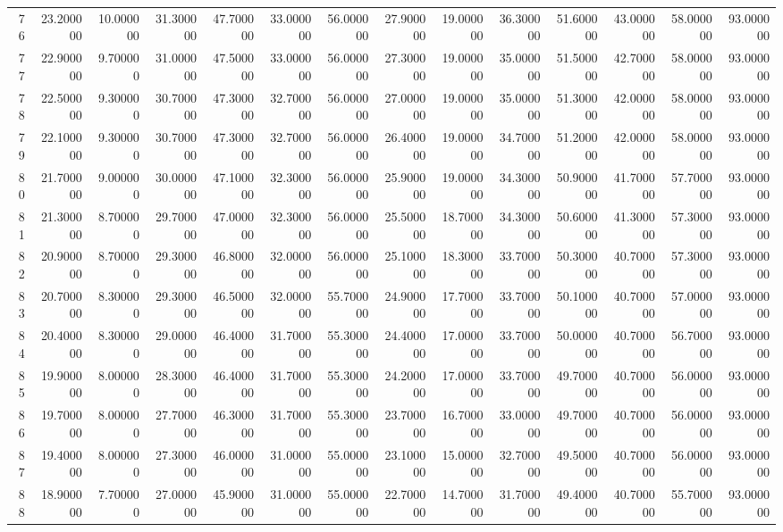 \begin{tabular}{rrrrrrrrrrrrrr}
76 & 23.200000 & 10.000000 & 31.300000 & 47.700000 & 33.000000 & 56.000000 & 27.900000 & 19.000000 & 36.300000 & 51.600000 & 43.000000 & 58.000000 & 93.000000 \\
77 & 22.900000 & 9.700000 & 31.000000 & 47.500000 & 33.000000 & 56.000000 & 27.300000 & 19.000000 & 35.000000 & 51.500000 & 42.700000 & 58.000000 & 93.000000 \\
78 & 22.500000 & 9.300000 & 30.700000 & 47.300000 & 32.700000 & 56.000000 & 27.000000 & 19.000000 & 35.000000 & 51.300000 & 42.000000 & 58.000000 & 93.000000 \\
79 & 22.100000 & 9.300000 & 30.700000 & 47.300000 & 32.700000 & 56.000000 & 26.400000 & 19.000000 & 34.700000 & 51.200000 & 42.000000 & 58.000000 & 93.000000 \\
80 & 21.700000 & 9.000000 & 30.000000 & 47.100000 & 32.300000 & 56.000000 & 25.900000 & 19.000000 & 34.300000 & 50.900000 & 41.700000 & 57.700000 & 93.000000 \\
81 & 21.300000 & 8.700000 & 29.700000 & 47.000000 & 32.300000 & 56.000000 & 25.500000 & 18.700000 & 34.300000 & 50.600000 & 41.300000 & 57.300000 & 93.000000 \\
82 & 20.900000 & 8.700000 & 29.300000 & 46.800000 & 32.000000 & 56.000000 & 25.100000 & 18.300000 & 33.700000 & 50.300000 & 40.700000 & 57.300000 & 93.000000 \\
83 & 20.700000 & 8.300000 & 29.300000 & 46.500000 & 32.000000 & 55.700000 & 24.900000 & 17.700000 & 33.700000 & 50.100000 & 40.700000 & 57.000000 & 93.000000 \\
84 & 20.400000 & 8.300000 & 29.000000 & 46.400000 & 31.700000 & 55.300000 & 24.400000 & 17.000000 & 33.700000 & 50.000000 & 40.700000 & 56.700000 & 93.000000 \\
85 & 19.900000 & 8.000000 & 28.300000 & 46.400000 & 31.700000 & 55.300000 & 24.200000 & 17.000000 & 33.700000 & 49.700000 & 40.700000 & 56.000000 & 93.000000 \\
86 & 19.700000 & 8.000000 & 27.700000 & 46.300000 & 31.700000 & 55.300000 & 23.700000 & 16.700000 & 33.000000 & 49.700000 & 40.700000 & 56.000000 & 93.000000 \\
87 & 19.400000 & 8.000000 & 27.300000 & 46.000000 & 31.000000 & 55.000000 & 23.100000 & 15.000000 & 32.700000 & 49.500000 & 40.700000 & 56.000000 & 93.000000 \\
88 & 18.900000 & 7.700000 & 27.000000 & 45.900000 & 31.000000 & 55.000000 & 22.700000 & 14.700000 & 31.700000 & 49.400000 & 40.700000 & 55.700000 & 93.000000 \\

\end{tabular}
